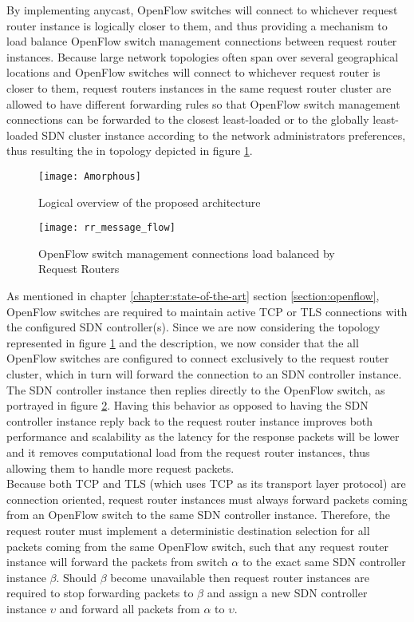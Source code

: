 By implementing \gls{anycast}, OpenFlow switches will connect to whichever request router instance is logically closer to them, and thus providing a mechanism to load balance OpenFlow switch management connections between request router instances.
Because large network topologies often span over several geographical locations and OpenFlow switches will connect to whichever request router is closer to them, request routers instances in the same request router cluster are allowed to have different forwarding rules so that OpenFlow switch management connections can be forwarded to the closest least-loaded or to the globally least-loaded \gls{SDN} cluster instance according to the network administrators preferences, thus resulting the in topology depicted in figure \ref{fig:Amorphous}.\\
%
\begin{figure}
	\centering
	\texttt{[image: Amorphous]}
	\caption{Logical overview of the proposed architecture}
	\label{fig:Amorphous}
\end{figure}
%
%
\begin{figure}
	\centering
	\texttt{[image: rr\_message\_flow]}
	\caption{OpenFlow switch management connections load balanced by Request Routers}
	\label{fig:rr_message_flow}
\end{figure}
%
As mentioned in chapter \ref*{chapter:state-of-the-art} section \ref{section:openflow}, OpenFlow switches are required to maintain active \gls{TCP} or \gls{TLS} connections with the configured \gls{SDN} controller(s).
Since we are now considering the topology represented in figure \ref{fig:Amorphous} and the description, we now consider that the all OpenFlow switches are configured to connect exclusively to the request router cluster, which in turn will forward the connection to an \gls{SDN} controller instance.
The \gls{SDN} controller instance then replies directly to the OpenFlow switch, as portrayed in figure \ref{fig:rr_message_flow}.
Having this behavior as opposed to having the \gls{SDN} controller instance reply back to the request router instance improves both performance and scalability as the latency for the response packets will be lower and it removes computational load from the request router instances, thus allowing them to handle more request packets.\\
Because both \gls{TCP} and \gls{TLS} (which uses \gls{TCP} as its transport layer protocol\cite{rfc5246}) are connection oriented, request router instances must always forward packets coming from an OpenFlow switch to the same \gls{SDN} controller instance.
Therefore, the request router must implement a deterministic destination selection for all packets coming from the same OpenFlow switch, such that any request router instance will forward the packets from switch $\alpha$ to the exact same \gls{SDN} controller instance $\beta$.
Should $\beta$ become unavailable then request router instances are required to stop forwarding packets to $\beta$ and assign a new \gls{SDN} controller instance $\upsilon$ and forward all packets from $\alpha$ to $\upsilon$.
